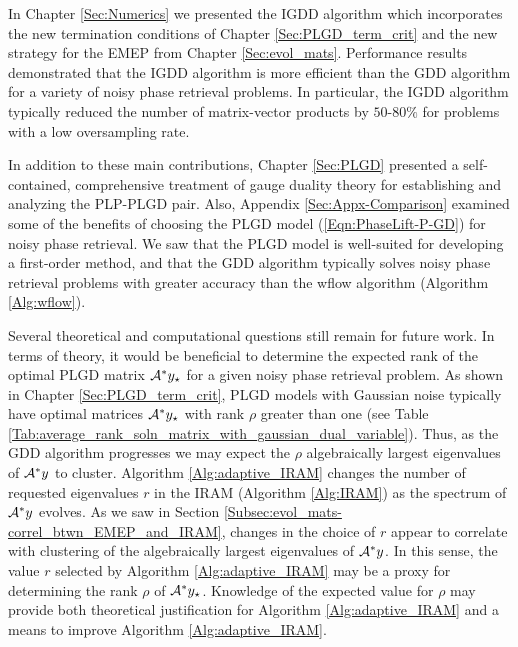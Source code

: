 In Chapter \ref{Sec:Numerics} we presented the IGDD algorithm which incorporates the new termination conditions of Chapter \ref{Sec:PLGD_term_crit} and the new strategy for the EMEP from Chapter \ref{Sec:evol_mats}.
Performance results demonstrated that the IGDD algorithm is more efficient than the GDD algorithm for a variety of noisy phase retrieval problems.
In particular, the IGDD algorithm typically reduced the number of matrix-vector products by $50$-$80\%$ for problems with a low oversampling rate.


In addition to these main contributions, Chapter \ref{Sec:PLGD} presented a self-contained, comprehensive treatment of gauge duality theory for establishing and analyzing the PLP-PLGD pair.
Also, Appendix \ref{Sec:Appx-Comparison} examined some of the benefits of choosing the PLGD model (\ref{Eqn:PhaseLift-P-GD}) for noisy phase retrieval.
We saw that the PLGD model is well-suited for developing a first-order method, and that the GDD algorithm typically solves noisy phase retrieval problems with greater accuracy than the wflow algorithm (Algorithm \ref{Alg:wflow}).




Several theoretical and computational questions still remain for future work.  
In terms of theory, it would be beneficial to determine the expected rank of the optimal PLGD matrix ${\mathcal A}^*y_\star$ for a given noisy phase retrieval problem. 
As shown in Chapter \ref{Sec:PLGD_term_crit}, PLGD models with Gaussian noise typically have optimal matrices ${\mathcal A}^*y_\star$ with rank $\rho$ greater than one (see Table \ref{Tab:average_rank_soln_matrix_with_gaussian_dual_variable}).
Thus, as the GDD algorithm progresses we may expect the $\rho$ algebraically largest eigenvalues of ${\mathcal A}^*y$ to cluster.
Algorithm \ref{Alg:adaptive_IRAM} changes the number of requested eigenvalues $r$ in the IRAM (Algorithm \ref{Alg:IRAM}) as the spectrum of ${\mathcal A}^*y$ evolves.
As we saw in Section \ref{Subsec:evol_mats-correl_btwn_EMEP_and_IRAM}, changes in the choice of $r$ appear to correlate with clustering of the algebraically largest eigenvalues of ${\mathcal A}^*y$.
In this sense, the value $r$ selected by Algorithm \ref{Alg:adaptive_IRAM} may be a proxy for determining the rank $\rho$ of ${\mathcal A}^*y_\star$.
Knowledge of the expected value for $\rho$ may provide both theoretical justification for Algorithm \ref{Alg:adaptive_IRAM} and a means to improve Algorithm \ref{Alg:adaptive_IRAM}.


